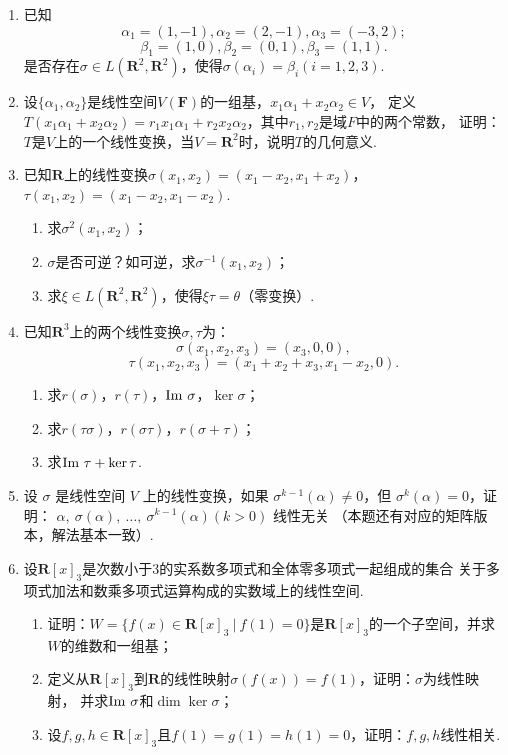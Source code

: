 \begin{enumerate}
    \item 已知
	\[\alpha_1=(1,-1),\alpha_2=(2,-1),\alpha_3=(-3,2);\]
	\[\beta_1=(1,0),\beta_2=(0,1),\beta_3=(1,1).\]
	是否存在$\sigma\in L(\mathbf{R}^2,\mathbf{R}^2)$，使得$\sigma(\alpha_i)=\beta_i(i=1,2,3)$.
	\item 设$\{\alpha_1,\alpha_2\}$是线性空间$V(\mathbf{F})$的一组基，$x_1\alpha_1+x_2\alpha_2 \in V$，
	定义$T(x_1\alpha_1+x_2\alpha_2)=r_1x_1\alpha_1+r_2x_2\alpha_2$，其中$r_1,r_2$是域$F$中的两个常数，
	证明：$T$是$V$上的一个线性变换，当$V=\mathbf{R}^2$时，说明$T$的几何意义.
	\item 已知$\mathbf{R}$上的线性变换$\sigma(x_1,x_2)=(x_1-x_2,x_1+x_2)$，$\tau(x_1,x_2)=(x_1-x_2,x_1-x_2)$.
	\begin{enumerate}[label=(\arabic*)]
        \item 求$\sigma^2(x_1,x_2)$；
        \item $\sigma$是否可逆？如可逆，求$\sigma^{-1}(x_1,x_2)$；
        \item 求$\xi\in L(\mathbf{R}^2,\mathbf{R}^2)$，使得$\xi\tau=\theta$（零变换）.
    \end{enumerate}
    \item 已知$\mathbf{R}^3$上的两个线性变换$\sigma,\tau$为：
	\[\sigma(x_1,x_2,x_3)=(x_3,0,0),\]
	\[\tau(x_1,x_2,x_3)=(x_1+x_2+x_3,x_1-x_2,0).\]
    \begin{enumerate}[label=(\arabic*)]
        \item 求$r(\sigma)$，$r(\tau)$，$\textup{Im }\sigma$，$\ker\sigma$；
        \item 求$r(\tau\sigma)$，$r(\sigma\tau)$，$r(\sigma+\tau)$；
        \item 求$\textup{Im }\tau+\ker\tau$.
    \end{enumerate}
    \item 设 $\sigma$ 是线性空间 $V$ 上的线性变换，如果 $\sigma^{k-1}(\alpha) \neq 0$，但 $\sigma^{k}(\alpha) = 0$，证明：\newline
	$\alpha,\ \sigma(\alpha),\ \dots,\ \sigma^{k-1}(\alpha)(k>0)$ 线性无关
	（本题还有对应的矩阵版本，解法基本一致）.
    \item 设$\mathbf{R}[x]_3$是次数小于3的实系数多项式和全体零多项式一起组成的集合
	关于多项式加法和数乘多项式运算构成的实数域上的线性空间.
    \begin{enumerate}[label=(\arabic*)]
        \item 证明：$W=\{f(x)\in \mathbf{R}[x]_3\ |\ f(1)=0\}$是$\mathbf{R}[x]_3$的一个子空间，并求$W$的维数和一组基；
        \item 定义从$\mathbf{R}[x]_3$到$\mathbf{R}$的线性映射$\sigma(f(x))=f(1)$，证明：$\sigma$为线性映射，
        并求$\textup{Im }\sigma$和$\dim\ker\sigma$；
        \item 设$f,g,h \in \mathbf{R}[x]_3$且$f(1)=g(1)=h(1)=0$，证明：$f,g,h$线性相关.
    \end{enumerate}
\end{enumerate}
